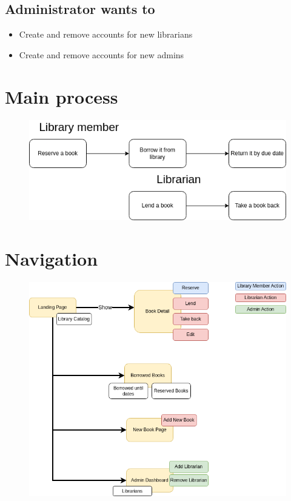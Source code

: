 \documentclass[11pt,twoside,a4paper]{article}
\begin{document}
\subsection*{Administrator wants to}
\begin{itemize}
    \item Create and remove accounts for new librarians
    \item Create and remove accounts for new admins
\end{itemize}

\section{Main process}
\begin{figure}[!ht]
    \includegraphics[scale=.75]{../drawio/Jibrarian-Main-Process.drawio.png}
    \centering
\end{figure}

\pagebreak
\section{Navigation}
\begin{figure}[!ht]
    \includegraphics[scale=.7]{../drawio/Jibrarian-Navigation.drawio.png}
    \centering
\end{figure}
\end{document}
